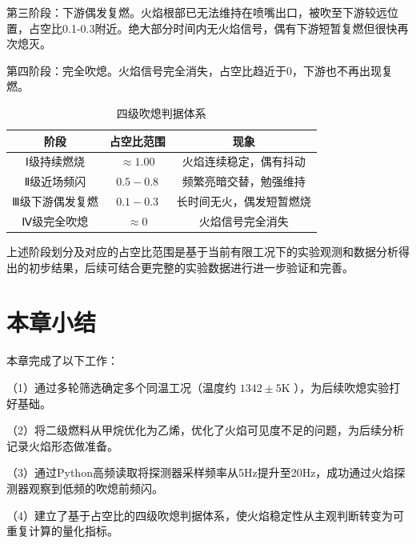 第三阶段：下游偶发复燃。火焰根部已无法维持在喷嘴出口，被吹至下游较远位置，占空比0.1-0.3附近。绝大部分时间内无火焰信号，偶有下游短暂复燃但很快再次熄灭。

第四阶段：完全吹熄。火焰信号完全消失，占空比趋近于0，下游也不再出现复燃。

\begin{table}[!htbp]
	\centering
	\caption{四级吹熄判据体系}
	\begin{tabular}{c|c|c}
		\hline
		阶段 & 占空比范围 & 现象 \\
		\hline
		Ⅰ级持续燃烧 & \(\approx 1.00\) & 火焰连续稳定，偶有抖动 \\
		Ⅱ级近场频闪 & \(0.5-0.8\) & 频繁亮暗交替，勉强维持 \\
		Ⅲ级下游偶发复燃 & \(0.1-0.3\) & 长时间无火，偶发短暂燃烧 \\
		Ⅳ级完全吹熄 & \(\approx 0\) & 火焰信号完全消失 \\
		\hline
	\end{tabular}
\end{table}

上述阶段划分及对应的占空比范围是基于当前有限工况下的实验观测和数据分析得出的初步结果，后续可结合更完整的实验数据进行进一步验证和完善。

\section{本章小结}

本章完成了以下工作：

（1）通过多轮筛选确定多个同温工况（温度约 \(1342\pm 5\mathrm{K}\) ），为后续吹熄实验打好基础。

（2）将二级燃料从甲烷优化为乙烯，优化了火焰可见度不足的问题，为后续分析记录火焰形态做准备。

（3）通过Python高频读取将探测器采样频率从5Hz提升至20Hz，成功通过火焰探测器观察到低频的吹熄前频闪。

（4）建立了基于占空比的四级吹熄判据体系，使火焰稳定性从主观判断转变为可重复计算的量化指标。